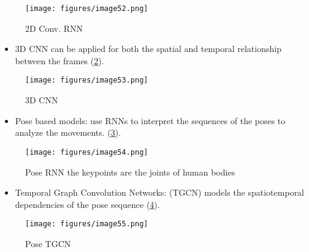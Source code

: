 \documentclass[12pt]{book}
\begin{document}
\begin{figure}[!htbp]
\centering
  \texttt{[image: figures/image52.png]}
  \\
  \caption{2D Conv. RNN \cite{DON2020}}
  \label{fig:fig28}
\end{figure}

\begin{itemize}
    \item 3D CNN can be applied for both the spatial and temporal relationship between the frames (\ref{fig:fig29}).
\end{itemize}

\begin{figure}[!htbp]
\centering
  \texttt{[image: figures/image53.png]}
  \\
  \caption{3D CNN \cite{DON2020}}
  \label{fig:fig29}
\end{figure}

\begin{itemize}
    \item Pose based models: use RNNs to interpret the sequences of the poses to analyze the movements. (\ref{fig:fig30}).
\end{itemize}

\begin{figure}[!htbp]
\centering
  \texttt{[image: figures/image54.png]}
  \\
  \caption{Pose RNN the keypoints are the joints of human bodies \cite{DON2020}}
  \label{fig:fig30}
\end{figure}

\begin{itemize}
    \item Temporal Graph Convolution Networks: (TGCN) models the spatiotemporal dependencies of the pose sequence (\ref{fig:fig31}).
\end{itemize}

\begin{figure}[!htbp]
\centering
  \texttt{[image: figures/image55.png]}
  \\
  \caption{Pose TGCN \cite{DON2020}}
  \label{fig:fig31}
\end{figure}
\end{document}
